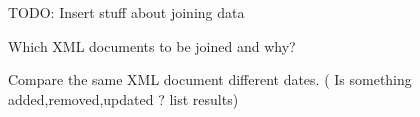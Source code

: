 TODO: Insert stuff about joining data

Which XML documents to be joined and why?

Compare the same XML document different dates.
( Is something added,removed,updated ? list results)